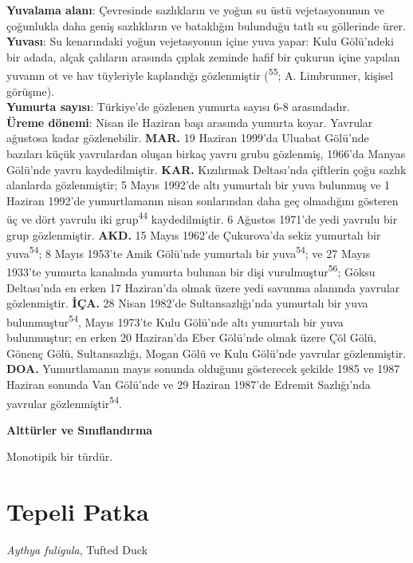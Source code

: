 \documentclass[
  letterpaper,
  DIV=11,
  numbers=noendperiod]{scrreprt}
\begin{document}
\textbf{Yuvalama alanı}: Çevresinde sazlıkların ve yoğun su üstü
vejetasyonunun ve çoğunlukla daha geniş sazlıkların ve bataklığın
bulunduğu tatlı su göllerinde ürer.\\
\textbf{Yuvası}: Su kenarındaki yoğun vejetasyonun içine yuva yapar:
Kulu Gölü'ndeki bir adada, alçak çalıların arasında çıplak zeminde hafif
bir çukurun içine yapılan yuvanın ot ve hav tüyleriyle kaplandığı
gözlenmiştir (\textsuperscript{55}; A. Limbrunner, kişisel görüşme).\\
\textbf{Yumurta sayısı}: Türkiye'de gözlenen yumurta sayısı 6-8
arasındadır.\\
\textbf{Üreme dönemi}: Nisan ile Haziran başı arasında yumurta koyar.
Yavrular ağustosa kadar gözlenebilir. \textbf{MAR.} 19 Haziran 1999'da
Uluabat Gölü'nde bazıları küçük yavrulardan oluşan birkaç yavru grubu
gözlenmiş, 1966'da Manyas Gölü'nde yavru kaydedilmiştir. \textbf{KAR.}
Kızılırmak Deltası'nda çiftlerin çoğu sazlık alanlarda gözlenmiştir; 5
Mayıs 1992'de altı yumurtalı bir yuva bulunmuş ve 1 Haziran 1992'de
yumurtlamanın nisan sonlarından daha geç olmadığını gösteren üç ve dört
yavrulu iki grup\textsuperscript{44} kaydedilmiştir. 6 Ağustos 1971'de
yedi yavrulu bir grup gözlenmiştir. \textbf{AKD.} 15 Mayıs 1962'de
Çukurova'da sekiz yumurtalı bir yuva\textsuperscript{54}; 8 Mayıs
1953'te Amik Gölü'nde yumurtalı bir yuva\textsuperscript{54}; ve 27
Mayıs 1933'te yumurta kanalında yumurta bulunan bir dişi
vurulmuştur\textsuperscript{56}; Göksu Deltası'nda en erken 17
Haziran'da olmak üzere yedi savunma alanında yavrular gözlenmiştir.
\textbf{İÇA.} 28 Nisan 1982'de Sultansazlığı'nda yumurtalı bir yuva
bulunmuştur\textsuperscript{54}, Mayıs 1973'te Kulu Gölü'nde altı
yumurtalı bir yuva bulunmuştur; en erken 20 Haziran'da Eber Gölü'nde
olmak üzere Çöl Gölü, Gönenç Gölü, Sultansazlığı, Mogan Gölü ve Kulu
Gölü'nde yavrular gözlenmiştir. \textbf{DOA.} Yumurtlamanın mayıs
sonunda olduğunu gösterecek şekilde 1985 ve 1987 Haziran sonunda Van
Gölü'nde ve 29 Haziran 1987'de Edremit Sazlığı'nda yavrular
gözlenmiştir\textsuperscript{54}.

\textbf{Alttürler ve Sınıflandırma}

Monotipik bir türdür.

\hypertarget{tepeli-patka}{%
\section{Tepeli Patka}\label{tepeli-patka}}

\emph{Aythya fuligula}, Tufted Duck
\end{document}
